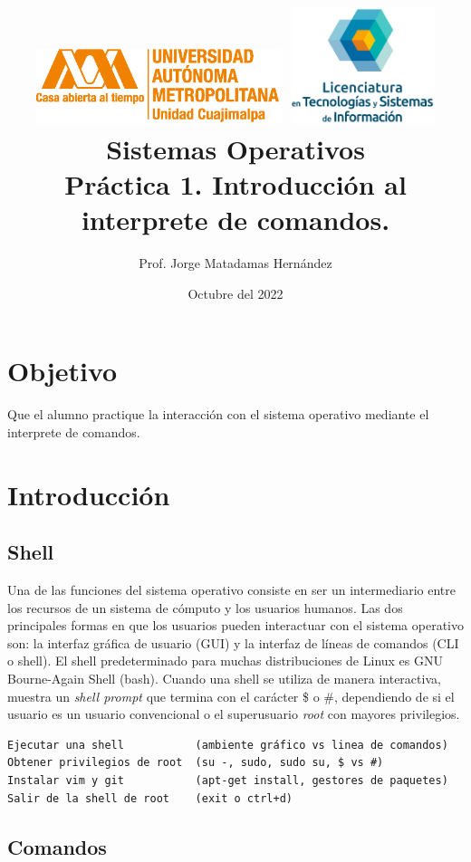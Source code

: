 \documentclass[12pt]{article}
\title{
\vspace{-2cm}
{\includegraphics[height=2.2cm]{imgs/logoUAMC.eps}}
\hspace{3.5cm}
{\includegraphics[height=3.4cm]{imgs/logoLicTySI.eps}}\\
\vspace{1cm}
{\large Sistemas Operativos}\\
{Práctica 1. Introducción al interprete de comandos.}
}
\author{Prof. Jorge Matadamas Hernández}
\date{Octubre del 2022}
\begin{document}
\maketitle



\section{Objetivo}
Que el alumno practique la interacción con el sistema operativo mediante el interprete de comandos.


\section{Introducción}

\subsection{Shell}

Una de las funciones del sistema operativo consiste en ser un intermediario entre los recursos de un sistema de cómputo y los usuarios humanos. Las dos principales formas en que los usuarios pueden interactuar con el sistema operativo son: la interfaz gráfica de usuario (GUI) y la interfaz de líneas de comandos (CLI o shell). El shell predeterminado para muchas distribuciones de Linux es GNU Bourne-Again Shell (bash). Cuando una shell se utiliza de manera interactiva, muestra un \textit{shell prompt} que termina con el carácter {\ttfamily\$} o {\ttfamily\#}, dependiendo de si el usuario es un usuario convencional o el superusuario \textit{root} con mayores privilegios. 

\begin{verbatim}
Ejecutar una shell           (ambiente gráfico vs linea de comandos)
Obtener privilegios de root  (su -, sudo, sudo su, $ vs #)
Instalar vim y git           (apt-get install, gestores de paquetes)
Salir de la shell de root    (exit o ctrl+d)
\end{verbatim}



\subsection{Comandos}
\end{document}
